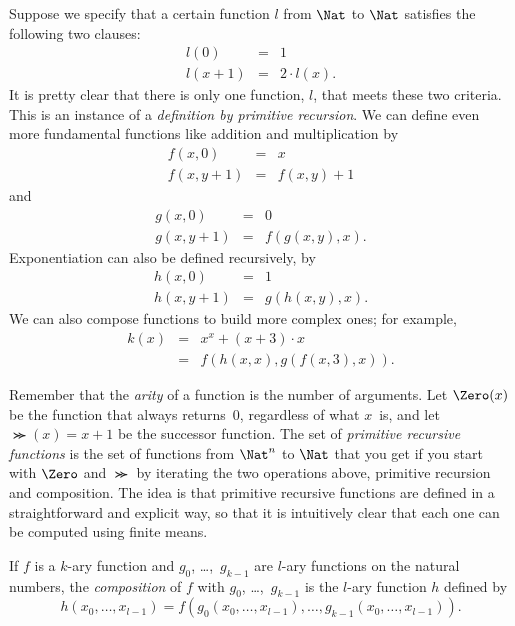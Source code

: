 \documentclass[../../../include/open-logic-section]{subfiles}
\begin{document}

\begin{explain}
Suppose we specify that a certain function $l$ from $\Nat$ to $\Nat$
satisfies the following two clauses:
\begin{eqnarray*}
l(0) & = & 1 \\
l(x+1) & = & 2 \cdot l(x).
\end{eqnarray*}
It is pretty clear that there is only one function, $l$, that meets
these two criteria. This is an instance of a \emph{definition by
  primitive recursion}. We can define even more fundamental functions
like addition and multiplication by
\begin{eqnarray*}
f(x,0) & = & x \\
f(x,y+1) & = & f(x,y)+1
\end{eqnarray*}
and
\begin{eqnarray*}
g(x,0) & = & 0 \\
g(x,y+1) & = & f(g(x,y),x).
\end{eqnarray*}
Exponentiation can also be defined recursively, by
\begin{eqnarray*}
h(x,0) & = & 1 \\
h(x,y+1) & = & g(h(x,y),x).
\end{eqnarray*}
We can also compose functions to build more complex ones; for example,
\begin{eqnarray*}
k(x) & = & x^x + (x + 3) \cdot x \\
& = & f(h(x,x),g(f(x,3),x)).
\end{eqnarray*}

Remember that the \emph{arity} of a function is the number of
arguments. Let $\Zero(x)$ be the function that always returns~$0$,
regardless of what $x$~is, and let $\Succ(x) = x+1$ be the successor
function.  The set of \emph{primitive recursive functions} is the set
of functions from $\Nat^n$ to $\Nat$ that you get if you start with
$\Zero$ and $\Succ$ by iterating the two operations above, primitive
recursion and composition. The idea is that primitive recursive
functions are defined in a straightforward and explicit way, so that
it is intuitively clear that each one can be computed using finite
means.
\end{explain}

\begin{defn}
If $f$ is a $k$-ary function and $g_0$, \dots,~$g_{k-1}$ are $l$-ary
functions on the natural numbers, the \emph{composition} of $f$ with
$g_0$, \dots,~$g_{k-1}$ is the $l$-ary function $h$ defined by
\[
h(x_0,\dots,x_{l-1}) =
f(g_0(x_0,\dots,x_{l-1}),\dots,g_{k-1}(x_0,\dots,x_{l-1})) .
\]
\end{defn}
\end{document}
